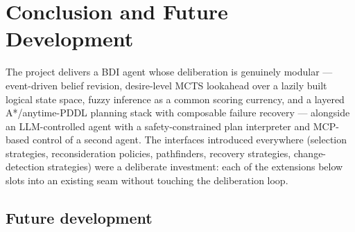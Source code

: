 \section{Conclusion and Future Development}
\label{sec:future}

The project delivers a BDI agent whose deliberation is genuinely modular --- event-driven belief
revision, desire-level MCTS lookahead over a lazily built logical state space, fuzzy inference
as a common scoring currency, and a layered A*/anytime-PDDL planning stack with composable
failure recovery --- alongside an LLM-controlled agent with a safety-constrained plan
interpreter and MCP-based control of a second agent. The interfaces introduced everywhere
(selection strategies, reconsideration policies, pathfinders, recovery strategies,
change-detection strategies) were a deliberate investment: each of the extensions below slots
into an existing seam without touching the deliberation loop.

\subsection{Future development}


